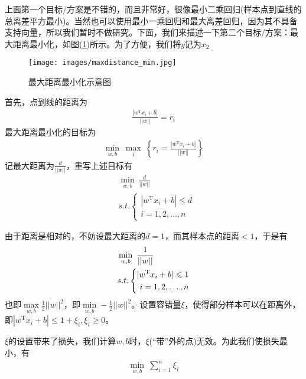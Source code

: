     \par
    上面第一个目标/方案是不错的，而且非常好，很像最小二乘回归(样本点到直线的总离差平方最小)。当然也可以使用最小一乘回归和最大离差回归，因为其不具备支持向量，所以我们暂时不做研究。下面，我们来描述一下第二个目标/方案：最大距离最小化，如图(\ref{最大距离最小化示意图})所示。为了方便，我们将$y$记为$x_2$
            \begin{figure}[H]
            \centering
            \texttt{[image: images/maxdistance\_min.jpg]}
            \caption{最大距离最小化示意图}
            \label{最大距离最小化示意图}
            \end{figure}
    首先，点到线的距离为
    \begin{align*}
    \frac{|w^\mathrm{T}x_i+b|}{||w||} = r_i
    \end{align*}
    最大距离最小化的目标为
    \begin{align*}
    \min_{w,b}\ \max_{i}\ \left\{ r_i = \frac{|w^\mathrm{T}x_i+b|}{||w||}\right\}
    \end{align*}
    记最大距离为$\frac{d}{||w||}$，重写上述目标有
    \begin{align*}
    & \min_{w,b} \ \frac{d}{||w||}\\
    & s.t.\left\{
    \begin{aligned}
    |w^\mathrm{T}x_i+b| \leqslant d\\
    i=1,2,\dots,n
    \end{aligned}
    \right.
    \end{align*}
    \par
    由于距离是相对的，不妨设最大距离的$d=1$，而其样本点的距离$<1$，于是有
    \begin{align}
    \label{支持向量回归最大最小模型目标1}
    & \min_{w,b} \ \frac{1}{||w||}\\
    & s.t.\left\{
    \begin{aligned}
    |w^\mathrm{T}x_i +b| \leqslant 1\\
    i=1,2,\dots,n
    \end{aligned}
    \right.\notag
    \end{align}
    也即$\max\limits_{w,b}\frac{1}{2}||w||^2$，即$\min\limits_{w,b}-\frac{1}{2}||w||^2$。设置容错量$\xi$，使得部分样本可以在距离外，即$|w^\mathrm{T}x_i+b| \leqslant 1+\xi_i,\xi_i \geqslant 0$。
    \par
    $\xi$的设置带来了损失，我们计算$w,b$时，$\xi$(“带”外的点)无效。为此我们使损失最小，有
    \begin{align}
    \label{支持向量回归最大最小模型目标2}
    \min_{w,b} \ \sum_{i=1}^n \xi_i
    \end{align}
